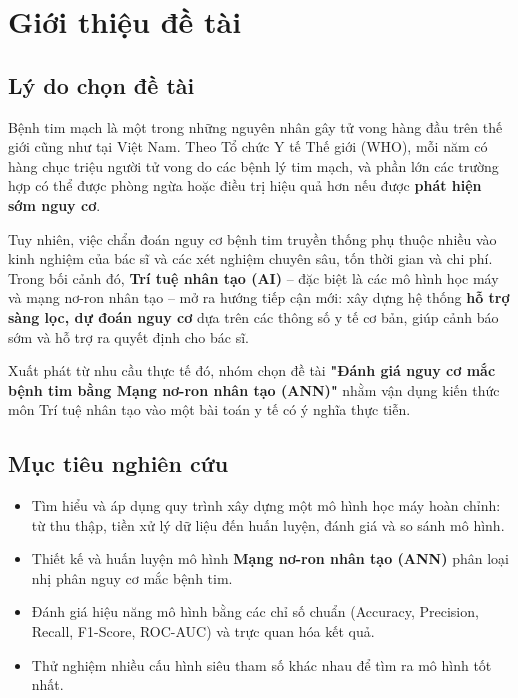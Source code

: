 
\chapter{Giới thiệu đề tài}
\label{chap:intro}

\section{Lý do chọn đề tài}
Bệnh tim mạch là một trong những nguyên nhân gây tử vong hàng đầu trên thế giới
cũng như tại Việt Nam. Theo Tổ chức Y tế Thế giới (WHO), mỗi năm có hàng chục
triệu người tử vong do các bệnh lý tim mạch, và phần lớn các trường hợp có thể
được phòng ngừa hoặc điều trị hiệu quả hơn nếu được \textbf{phát hiện sớm nguy cơ}.

Tuy nhiên, việc chẩn đoán nguy cơ bệnh tim truyền thống phụ thuộc nhiều vào kinh
nghiệm của bác sĩ và các xét nghiệm chuyên sâu, tốn thời gian và chi phí. Trong
bối cảnh đó, \textbf{Trí tuệ nhân tạo (AI)} -- đặc biệt là các mô hình học máy và
mạng nơ-ron nhân tạo -- mở ra hướng tiếp cận mới: xây dựng hệ thống \textbf{hỗ trợ
sàng lọc, dự đoán nguy cơ} dựa trên các thông số y tế cơ bản, giúp cảnh báo sớm và
hỗ trợ ra quyết định cho bác sĩ.

Xuất phát từ nhu cầu thực tế đó, nhóm chọn đề tài \textbf{"Đánh giá nguy cơ mắc
bệnh tim bằng Mạng nơ-ron nhân tạo (ANN)"} nhằm vận dụng kiến thức môn Trí tuệ
nhân tạo vào một bài toán y tế có ý nghĩa thực tiễn.

\section{Mục tiêu nghiên cứu}
\begin{itemize}
  \item Tìm hiểu và áp dụng quy trình xây dựng một mô hình học máy hoàn chỉnh: từ
        thu thập, tiền xử lý dữ liệu đến huấn luyện, đánh giá và so sánh mô hình.
  \item Thiết kế và huấn luyện mô hình \textbf{Mạng nơ-ron nhân tạo (ANN)} phân
        loại nhị phân nguy cơ mắc bệnh tim.
  \item Đánh giá hiệu năng mô hình bằng các chỉ số chuẩn (Accuracy, Precision,
        Recall, F1-Score, ROC-AUC) và trực quan hóa kết quả.
  \item Thử nghiệm nhiều cấu hình siêu tham số khác nhau để tìm ra mô hình tốt nhất.
\end{itemize}

